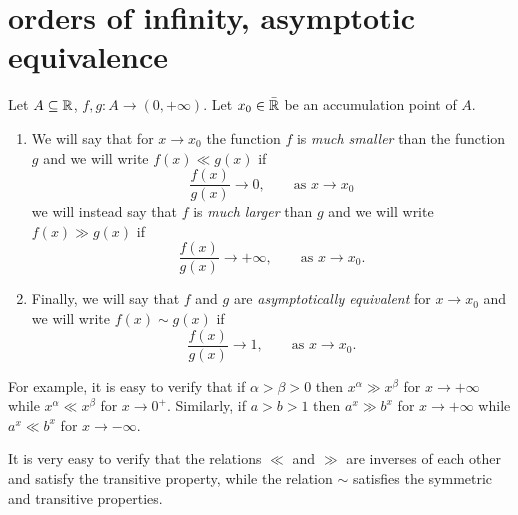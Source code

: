 \section{orders of infinity, asymptotic equivalence}

\begin{definition}%
  \label{def:ordine_infinito}%
  \mymark{***}%
%
  Let $A\subseteq {\mathbb R}$, $f,g\colon A \to (0,+\infty)$.
  Let $x_0\in \bar {{\mathbb R}}$ be an accumulation point of $A$.
  \begin{enumerate}
  \item
  We will say that
  for $x\to x_0$ the function $f$ is \emph{much smaller}
  than the function $g$ and we will write $f(x) \ll g(x)$ if
  \mymargin{$\ll$}%
\index{$\ll$}
  \[
  \frac{f(x)}{g(x)} \to 0, \qquad \text{as $x\to x_0$}
  \]
  we will instead say that $f$ is \emph{much larger}
  than $g$ and we will write $f(x) \gg g(x)$ if
  \mymargin{$\gg$}%
\index{$\gg$}
  \[
  \frac{f(x)}{g(x)} \to +\infty, \qquad \text{as $x\to x_0$.}
  \]
  \item
  Finally, we will say that $f$ and $g$
  are \emph{asymptotically equivalent}%
%
%
  for $x\to x_0$
  and we will write $f(x) \sim g(x)$ if
  \mymargin{$\sim$}%
\index{$\sim$}
  \[
  \frac{f(x)}{g(x)} \to 1, \qquad \text{as $x\to x_0.$}
  \]
  \end{enumerate}
\end{definition}
  
For example, it is easy to verify that if $\alpha > \beta > 0$
then $x^\alpha \gg x^\beta$ for $x\to +\infty$
while $x^\alpha \ll x^\beta$ for $x\to 0^+$.
Similarly, if $a>b>1$ then $a^x\gg b^x$ for $x\to +\infty$
while $a^x \ll b^x$ for $x\to -\infty$.

It is very easy to verify that the relations
$\ll$ and $\gg$ are inverses of each other
and satisfy the transitive property,
while the relation $\sim$ satisfies the symmetric
and transitive properties.

